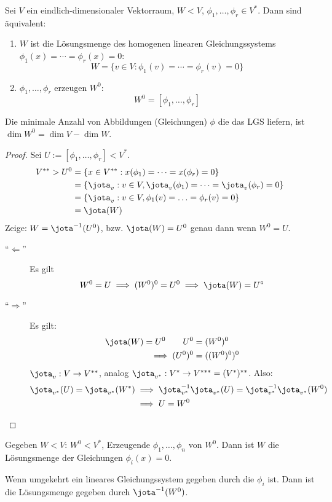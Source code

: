 \documentclass{mycourse}
\begin{document}
\begin{kor}
\label{kor:9.9}
Sei $V$ ein eindlich-dimensionaler Vektorraum, $W<V$, $\phi_1,\dotsc,\phi_r\in V^*$.
Dann sind äquivalent:
\begin{enumerate}
\item $W$ ist die Lösungsmenge des homogenen linearen Gleichungssystems $\phi_1(x)=\dotsb=\phi_r(x)=0$:
	\[
		W=\{v\in V:\phi_1(v)=\dotsb=\phi_r(v)=0\}
	\]
\item $\phi_1,\dotsc,\phi_r$ erzeugen $W^0$:
	\[
		W^0=[\phi_1,\dotsc,\phi_r]
	\]
\end{enumerate}
Die minimale Anzahl von Abbildungen (Gleichungen) $\phi$ die das LGS liefern, ist $\dim W^0=\dim V-\dim W$.

\begin{proof}
Sei $U:=[\phi_1,\dotsc,\phi_r]<V^*$.
\begin{align*}
V^{**}>U^0&=\{x\in V^{**}:x(\phi_1)=\dotsb=x(\phi_r)=0\}\\
&=\{\jota_v:v\in V, \jota_v(\phi_1)=\dotsb=\jota_v(\phi_r)=0\}\\
&=\{\jota_v:v\in V, \phi_1(v)=\dotsc=\phi_r(v)=0\}\\
&=\jota(W)
\end{align*}
Zeige: $W=\jota^{-1}(U^0)$, bzw. $\jota(W)=U^0$ genau dann wenn $W^0=U$.
\begin{description}
\item[``$\Longleftarrow$''] Es gilt
\[
W^0=U \implies (W^0)^0=U^0 \implies \jota(W)=U^\circ
\]
\item[``$\Longrightarrow$'']
Es gilt:
\begin{align*}
\jota(W)=U^0 \qquad U^0&=(W^0)^0\\
\implies (U^0)^0 &= ((W^0)^0)^0
\end{align*}
$\jota_v:V\to V^{**}$, analog $\jota_{v^*}:V^*\to V^{***}=(V^*)^{**}$.
Also:
\begin{align*}
\jota_{v^*}(U)=\jota_{v^*}(W^*) &\implies \jota_{v^*}^{-1}\jota_{v^*}(U)=\jota_{v^*}^{-1}\jota_{v^*}(W^0) \\
&\implies U=W^0
\end{align*}
\end{description}
\end{proof}
\end{kor}

Gegeben $W<V$: $W^0<V^*$, Erzeugende $\phi_1,\dotsc,\phi_n$ von $W^0$.
Dann ist $W$ die Lösungsmenge der Gleichungen $\phi_i(x)=0$.

Wenn umgekehrt ein lineares Gleichungssystem gegeben durch die $\phi_i$ ist.
Dann ist die Lösungsmenge gegeben durch $\jota^{-1}(W^0)$.
\end{document}
